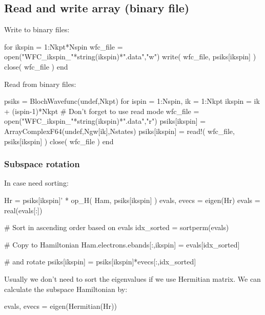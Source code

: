 \subsection{Read and write array (binary file)}

Write to binary files:
\begin{juliacode}
for ikspin = 1:Nkpt*Nspin
    wfc_file = open("WFC_ikspin_"*string(ikspin)*".data","w")
    write( wfc_file, psiks[ikspin] )
    close( wfc_file )
end
\end{juliacode}

Read from binary files:
\begin{juliacode}
psiks = BlochWavefunc(undef,Nkpt)
for ispin = 1:Nspin, ik = 1:Nkpt
    ikspin = ik + (ispin-1)*Nkpt
    # Don't forget to use read mode
    wfc_file = open("WFC_ikspin_"*string(ikspin)*".data","r")
    psiks[ikspin] = Array{ComplexF64}(undef,Ngw[ik],Nstates)
    psiks[ikspin] = read!( wfc_file, psiks[ikspin] )
    close( wfc_file )
end
\end{juliacode}




\subsubsection*{Subspace rotation}

In case need sorting:
\begin{juliacode}
Hr = psiks[ikspin]' * op_H( Ham, psiks[ikspin] )
evals, evecs = eigen(Hr)
evals = real(evals[:])

# Sort in ascending order based on evals
idx_sorted = sortperm(evals)

# Copy to Hamiltonian
Ham.electrons.ebands[:,ikspin] = evals[idx_sorted]

# and rotate
psiks[ikspin] = psiks[ikspin]*evecs[:,idx_sorted]
\end{juliacode}

Usually we don't need to sort the eigenvalues if we use Hermitian matrix. We can calculate the
subspace Hamiltonian by:
\begin{juliacode}
evals, evecs = eigen(Hermitian(Hr))
\end{juliacode}
